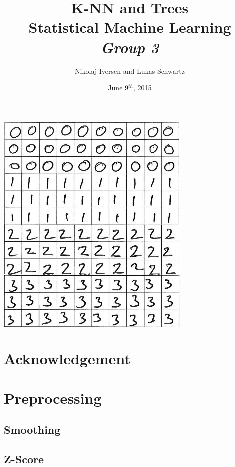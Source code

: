 \documentclass[12pt,a4paper]{article}
\begin{document}
\title{K-NN and Trees\\Statistical Machine Learning\\{\large\emph{Group 3}}}
\author{Nikolaj Iversen and Lukas Schwartz}
\date{June 9$^{th}$, 2015}
\maketitle

\vfill
\begin{center}
\includegraphics[width=0.7\textwidth]{graphics/digit_example}
\end{center}

\newpage

\section*{Acknowledgement}

\newpage

\tableofcontents
\listoffigures
\listoftables

\newpage

\section{Preprocessing}

\subsection{Smoothing}

\subsection{Z-Score}
\end{document}
